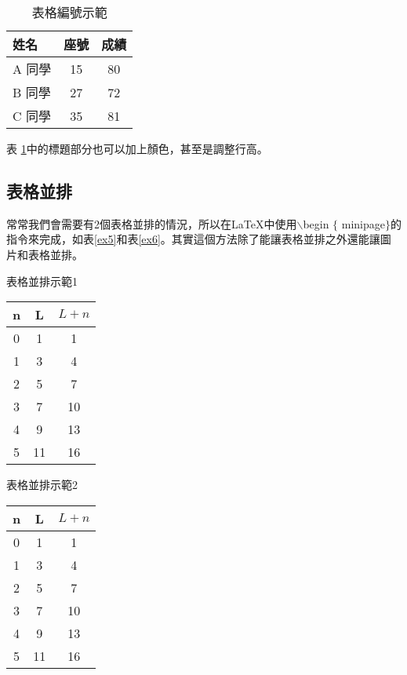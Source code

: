 \begin{table}[H]
    \centering
    \caption{表格編號示範}\label{dou}
    \smallskip
    \extrarowheight=2pt
    \begin{tabular}{lcc}
    \rowcolor{babyblue}
    \hline
    姓名       & 座號    & 成績 \\\hline
    A 同學    & 15       & 80 \\
    B 同學      & 27     & 72 \\
    C 同學     & 35      & 81 \\\hline
    \end{tabular}
\end{table}
\bigskip
表 \ref{dou}中的標題部分也可以加上顏色，甚至是調整行高。

\subsection{表格並排}

常常我們會需要有2個表格並排的情況，所以在\LaTeX 中使用$\backslash$begin $\lbrace$ minipage$\rbrace$的指令來完成，如表\ref{ex5}和表\ref{ex6}。其實這個方法除了能讓表格並排之外還能讓圖片和表格並排。

\bigskip
\begin{minipage}{\textwidth}
        \begin{minipage}[t]{0.45\textwidth}
            \centering
            \makeatletter{}\makeatother\caption{表格並排示範1}\label{ex5}
            \begin{tabular}{|ccc|}
\hline
\rowcolor{lightcornflowerblue}
n  & L  & $L+n$ \\ \hline
0  & 1  & 1 \\
1  & 3  & 4 \\
2  & 5  & 7 \\
3  & 7  & 10\\
4  & 9  & 13 \\
5  & 11 & 16 \\
\hline
\end{tabular}
        \end{minipage}
        \begin{minipage}[t]{0.45\textwidth}
        \centering
        \makeatletter{}\makeatother\caption{表格並排示範2}\label{ex6}
            \begin{tabular}{|ccc|}
\hline
\rowcolor{lightcornflowerblue}
n  & L  & $L+n$ \\ \hline
0  & 1  & 1 \\
1  & 3  & 4 \\
2  & 5  & 7 \\
3  & 7  & 10\\
4  & 9  & 13 \\
5  & 11 & 16 \\
\hline
\end{tabular}
\end{minipage}
\end{minipage}


